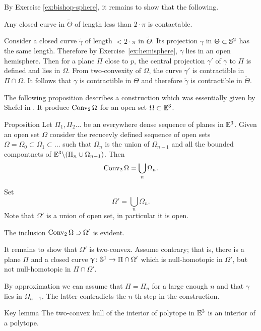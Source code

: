 By Exercise \ref{ex:bishop-sphere}, it remains to show that the following.
\begin{clm}{}
Any closed curve in $\tilde\Theta$ of length less than $2\cdot\pi$ is contactable.
\end{clm}


Consider a closed curve $\tilde \gamma$ of length $<2\cdot\pi$ in $\tilde\Theta$.
Its projection $\gamma$ in $\Theta\subset\SS^2$ has the same length.
Therefore by Exercise~\ref{ex:hemisphere}, $\gamma$ lies in an open hemisphere.
Then for a plane $\Pi$ close to $p$,
the central projection $\gamma'$ of $\gamma$ to $\Pi$ is defined and lies in $\Omega$.
From two-convexity of $\Omega$, the curve $\gamma'$ is contractible in $\Pi\cap \Omega$.
It follows that $\gamma$ is contractible in $\Theta$ 
and therefore $\tilde\gamma$ is contractible in $\tilde\Theta$.
\qeds

The following proposition 
describes a construction which was essentially given by Shefel in \cite{shefel-3D}.
It produce $\mathop{\rm Conv}\nolimits_2 \Omega$ for an open set $\Omega\subset\EE^3$.

\begin{thm}{Proposition}\label{prop:2-conv-construction}
Let $\Pi_1,\Pi_2\dots$ be an everywhere dense
sequence of planes in $\mathbb{E}^3$.
Given an open set $\Omega$ consider 
the recucevly defined sequence of open sets 
$\Omega=\Omega_0\subset\Omega_1\subset\dots$ 
such that 
$\Omega_n$ is the union of $\Omega_{n-1}$ 
and all the bounded compontnets of 
$\EE^3\backslash(\Pi_n\cup \Omega_{n-1})$.
Then 
\[\mathop{\rm Conv}\nolimits_2\Omega=\bigcup_n\Omega_n.\]

\end{thm}

Set 
\[\Omega'=\bigcup_n\Omega_n.\]
Note that $\Omega'$ is a union of open set, in particular it is open.

The inclusion $\Conv_2\Omega\supset\Omega'$
is evident.

It remains to show that $\Omega'$ is two-convex.
Assume contrary; 
that is, there is a plane $\Pi$ 
and a closed curve $\gamma\:\SS^1\to \Pi\cap \Omega'$ 
which is null-homotopic in $\Omega'$,
but not null-homotopic in $\Pi\cap\Omega'$.

By approximation we can assume that $\Pi=\Pi_n$ for a large enough  $n$ 
and that $\gamma$ lies in $\Omega_{n-1}$.
The latter contradicts the $n$-th step in the construction. 
\qeds



\begin{thm}{Key lemma}\label{lem:key-shefel}
The two-convex hull of the interior of polytope in $\mathbb{E}^3$
is an interior of a polytope.
\end{thm}

